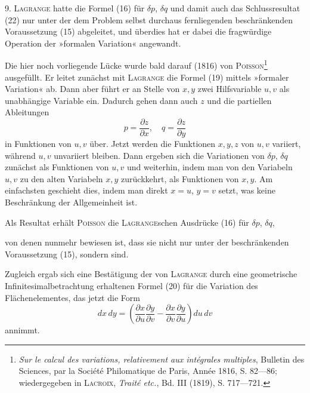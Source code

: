 \clearpage\begingroup\NoSourceHead
\makeatletter\tagsleft@true\let\veqno\@@leqno\makeatother
\renewcommand{\thefootnote}{\arabic{footnote})}\setcounter{footnote}{28}
\noindent\hspace*{\parindent}9. \textsc{Lagrange} hatte die Formel (16) für $\delta p$, $\delta q$ und damit auch das Schlussresultat
(22) nur unter der dem Problem selbst durchaus fernliegenden beschränkenden
Voraussetzung (15) abgeleitet, und überdies hat er dabei die
fragwürdige Operation der »formalen Variation« angewandt.

Die hier noch vorliegende Lücke wurde bald darauf (1816) von \textsc{Poisson}\footnote{\textit{Sur le calcul des variations, relativement aux intégrales multiples}, Bulletin des Sciences, par la Société Philomatique de Paris, Année 1816, S. 82—86; wiedergegeben in \textsc{Lacroix}, \textit{Traité etc.}, Bd. III (1819), S. 717—721.}
ausgefüllt. Er leitet zunächst mit \textsc{Lagrange} die Formel (19) mittels »formaler
Variation« ab. Dann aber führt er an Stelle von $x,y$ zwei Hilfsvariable $u,v$
als unabhängige Variable ein. Dadurch gehen dann auch $z$ und die partiellen
Ableitungen
\[
p=\frac{\partial z}{\partial x},\quad q=\frac{\partial z}{\partial y}
\]
in Funktionen von $u,v$ über. Jetzt werden die Funktionen $x,y,z$ von $u,v$
variiert, während $u,v$ unvariiert bleiben. Dann ergeben sich die Variationen
von $\delta p$, $\delta q$ zunächst als Funktionen von $u,v$ und weiterhin, indem man von
den Variabeln $u,v$ zu den alten Variabeln $x,y$ zurückkehrt, als Funktionen
von $x,y$. Am einfachsten geschieht dies, indem man direkt $x=u$, $y=v$
setzt, was keine Beschränkung der Allgemeinheit ist.

Als Resultat erhält \textsc{Poisson} die \textsc{Lagrange}schen Ausdrücke (16) für $\delta p$, $\delta q$,
\par\clearpage{}
\noindent von denen nunmehr bewiesen ist, dass sie nicht nur unter der beschränkenden
Voraussetzung (15), sondern  sind.

Zugleich ergab sich eine Bestätigung der von \textsc{Lagrange} durch eine geometrische
Infinitesimalbetrachtung erhaltenen Formel (20) für die Variation
des Flächenelementes, das jetzt die Form
\[
dx\,dy=\left(\frac{\partial x}{\partial u}\frac{\partial y}{\partial v}-\frac{\partial x}{\partial v}\frac{\partial y}{\partial u}\right)du\,dv
\]
annimmt.

